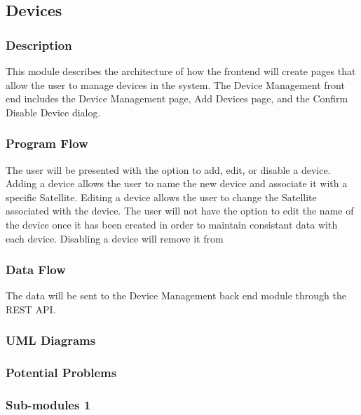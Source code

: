 
\subsection{Devices}

\subsubsection{Description}

This module describes the architecture of how the frontend will create pages that allow the user to manage devices in the system. 
The Device Management front end includes the Device Management page, Add Devices page, and the Confirm Disable Device dialog. 


\subsubsection{Program Flow}

The user will be presented with the option to add, edit, or disable a device. 
Adding a device allows the user to name the new device and associate it with a specific Satellite. 
Editing a device allows the user to change the Satellite associated with the device. 
The user will not have the option to edit the name of the device once it has been created in order to maintain consistant data with each device. 
Disabling a device will remove it from 


\subsubsection{Data Flow}

The data will be sent to the Device Management back end module through the REST API. 


\subsubsection{UML Diagrams}


\subsubsection{Potential Problems}


\subsubsection{Sub-modules 1}

